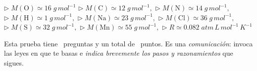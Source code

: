 \documentclass[a4paper,addpoints, 12pt]{exam}
\newcommand*\chem[1]{\ensuremath{\mathrm{#1}}}
\begin{document}
	\begin{coverpages}


\boxedpoints



\vspace*{\fill}

\begin{learn}
{$\triangleright\; M(\chem{O})\simeq16\;g\,mol^{-1}$\newline
$\triangleright\; M(\chem{C})\simeq12\;g\,mol^{-1},$\newline
$\triangleright\; M(\chem{N})\simeq14\;g\,mol^{-1},$\newline
$\triangleright\; M(\chem{H})\simeq1\;g\,mol^{-1},$\newline
$\triangleright\; M(\chem{Na})\simeq 23\;g\,mol^{-1},$\newline
$\triangleright\; M(\chem{Cl})\simeq 36\;g\,mol^{-1},$\newline
$\triangleright\; M(\chem{S})\simeq32\;g\,mol^{-1},$\newline
$\triangleright\; M(\chem{Mn})\simeq55\;g\,mol^{-1},$\newline
$\triangleright\; R\simeq 0.082\;atm\,L\,mol^{-1}\,K^{-1}$
}
\end{learn}	
\end{coverpages}

\newpage
\vspace*{-5ex}

\begin{problemas}{Esta prueba tiene \numquestions\ preguntas y un total de \numpoints\ puntos. Es una  \textit{comunicación}: invoca las leyes en que te basas e \textit{indica brevemente los pasos y razonamientos} que sigues.}
\end{problemas}
\end{document}
